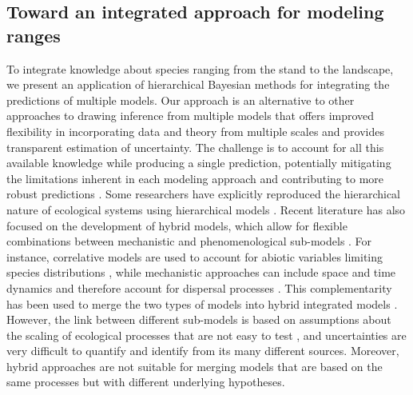 \documentclass[11pt]{article}
\begin{document}

\subsection*{Toward an integrated approach for modeling ranges}
To integrate knowledge about species ranging from the stand to the landscape, we present an application of hierarchical Bayesian methods for integrating the predictions of multiple models.
Our approach is an alternative to other approaches to drawing inference from multiple models that offers improved flexibility in incorporating data and theory from multiple scales and provides transparent estimation of uncertainty.
The challenge is to account for all this available knowledge while producing a single prediction, potentially mitigating the limitations inherent in each modeling approach and contributing to more robust predictions \citep{Pearson2003, Guisan2005, Araujo2006, Quillet2010}.
Some researchers have explicitly reproduced the hierarchical nature of ecological systems using hierarchical models \citep[e.g.][]{Royale2008, Catterall2012, Strigul2012, Soranno2014}. 
Recent literature has also focused on the development of hybrid models, which allow for flexible combinations between mechanistic and phenomenological sub-models \citep{Gallien2010, Thuiller2013}. 
For instance, correlative models are used to account for abiotic variables limiting species distributions \citep{Guisan2005}, while mechanistic approaches can include space and time dynamics and therefore account for dispersal processes \citep{Kearney2008}. 
This complementarity has been used to merge the two types of models into hybrid integrated models \citep[e.g.][]{Keith2008, Anderson2009, Smolik2010, Boulangeat2014}. 
However, the link between different sub-models is based on assumptions about the scaling of ecological processes that are not easy to test \citep{Gallien2010}, and uncertainties are very difficult to quantify and identify from its many different sources. 
Moreover, hybrid approaches are not suitable for merging models that are based on the same processes but with different underlying hypotheses.
\end{document}
